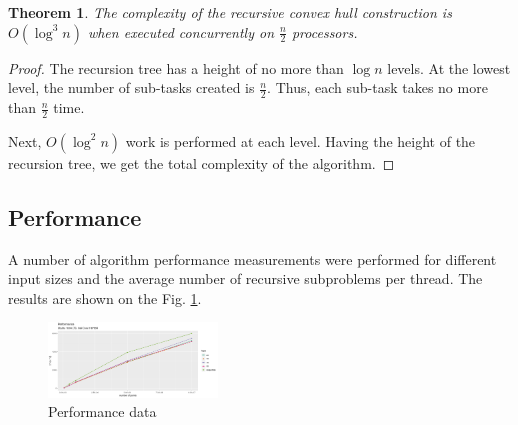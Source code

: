 \documentclass[twoside,twocolumn,10pt]{article}
\newtheorem{theorem}{Theorem}
\begin{document}
	\begin{theorem}
		The complexity of the recursive convex hull construction is $O(\log^3n)$ when executed concurrently on $\frac{n}{2}$ processors.
	\end{theorem}

	\begin{proof}
		The recursion tree has a height of no more than $\log n$ levels. At the lowest level, the number of sub-tasks created is $\frac{n}{2}$. Thus, each sub-task takes no more than $\frac{n}{2}$ time.

		Next, $O(\log^2 n)$ work is performed at each level. Having the height of the recursion tree, we get the total complexity of the algorithm.
	\end{proof}	


\subsection{Performance}


	A number of algorithm performance measurements were performed for different input sizes and the average number of recursive subproblems per thread. The results are shown on the Fig. \ref{fig:performance}.

	\begin{figure}[htb]
		\centering
		\includegraphics[width=0.4\textwidth, height=0.2\textheight]{performance}
		\caption{Performance data}
		\label{fig:performance}
	\end{figure}
\end{document}
